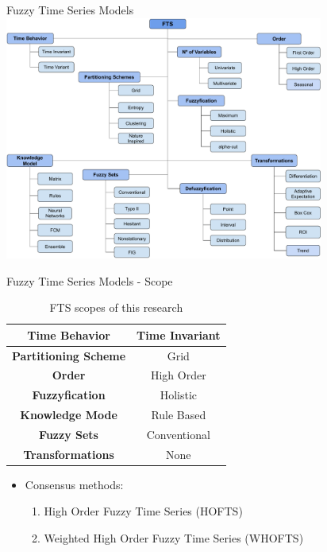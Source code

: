 \documentclass{beamer}
\begin{document}

\begin{frame}{Fuzzy Time Series Models}
\includegraphics[width=\textwidth,height=8cm]{figures/fts_taxonomy.pdf}
\end{frame}



\begin{frame}{Fuzzy Time Series Models - Scope}
\begin{table}[]
    \centering
    \begin{tabular}{|c|c|} \hline
         \textbf{Time Behavior} & Time Invariant  \\ \hline
         \textbf{Partitioning Scheme} & Grid  \\ \hline
         \textbf{Order} & High Order  \\ \hline
         \textbf{Fuzzyfication} & Holistic  \\ \hline
         \textbf{Knowledge Mode} & Rule Based  \\ \hline
         \textbf{Fuzzy Sets} & Conventional  \\ \hline
         \textbf{Transformations} & None  \\ \hline
    \end{tabular}
    \caption{FTS scopes of this research}
\end{table}
\begin{itemize}
    \item Consensus methods:
    \begin{enumerate}
        \item High Order Fuzzy Time Series (HOFTS)
        \item Weighted High Order Fuzzy Time Series (WHOFTS)
    \end{enumerate}
\end{itemize}
\end{frame}
\end{document}

